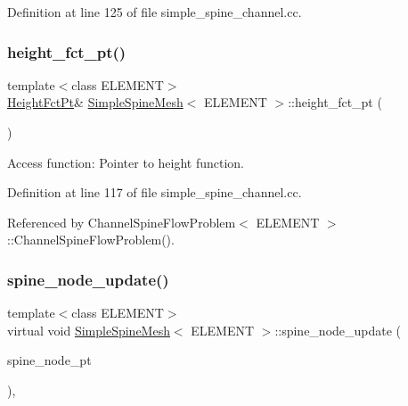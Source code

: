Definition at line 125 of file simple\+\_\+spine\+\_\+channel.\+cc.

\mbox{\label{classSimpleSpineMesh_af84290225b4aea3fd6ba27ad979059a0}} 
\subsubsection{\texorpdfstring{height\+\_\+fct\+\_\+pt()}{height\_fct\_pt()}}
{\footnotesize\ttfamily template$<$class E\+L\+E\+M\+E\+NT$>$ \\
\hyperlink{classSimpleSpineMesh_a671d96f0143dfeb7aaba8af56c0c0620}{Height\+Fct\+Pt}\& \hyperlink{classSimpleSpineMesh}{Simple\+Spine\+Mesh}$<$ E\+L\+E\+M\+E\+NT $>$\+::height\+\_\+fct\+\_\+pt (\begin{DoxyParamCaption}{ }\end{DoxyParamCaption})\hspace{0.3cm}{\ttfamily [inline]}}



Access function\+: Pointer to height function. 



Definition at line 117 of file simple\+\_\+spine\+\_\+channel.\+cc.



Referenced by Channel\+Spine\+Flow\+Problem$<$ E\+L\+E\+M\+E\+N\+T $>$\+::\+Channel\+Spine\+Flow\+Problem().

\mbox{\label{classSimpleSpineMesh_a4735e047eab146cafc3090f829373ef2}} 
\subsubsection{\texorpdfstring{spine\+\_\+node\+\_\+update()}{spine\_node\_update()}}
{\footnotesize\ttfamily template$<$class E\+L\+E\+M\+E\+NT$>$ \\
virtual void \hyperlink{classSimpleSpineMesh}{Simple\+Spine\+Mesh}$<$ E\+L\+E\+M\+E\+NT $>$\+::spine\+\_\+node\+\_\+update (\begin{DoxyParamCaption}\item[{Spine\+Node $\ast$}]{spine\+\_\+node\+\_\+pt }\end{DoxyParamCaption})\hspace{0.3cm}{\ttfamily [inline]}, {\ttfamily [virtual]}}




